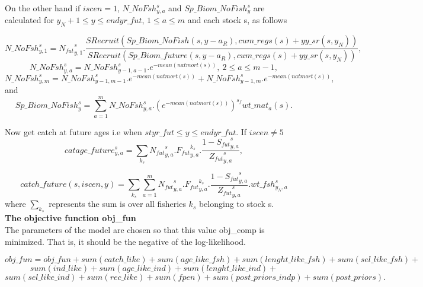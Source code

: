 \documentclass{article}
\begin{document}

On the other hand if $iscen=1$, $N\_NoFsh^s_{y,a}$ and $Sp\_Biom\_NoFish^s_y$ are calculated for $y_N+1\leq y \leq endyr\_fut$, $1\leq a \leq m$ and each stock s, as follows

\begin{equation}
    N\_NoFsh^{s}_{y,1}={N_{fut}}^s_{y,1}.\dfrac{SRecruit(Sp\_Biom\_NoFish(s,y-a_R),cum\_regs(s)+yy\_sr(s,y_N))}{ SRecruit(Sp\_Biom\_future(s,y-a_R),cum\_regs(s)+yy\_sr(s,y_N))},
\end{equation}
\begin{equation}
    N\_NoFsh^{s}_{y,a}=N\_NoFsh^s_{y-1,a-1}.e^{-mean(natmort(s))}, \ 2\leq a\leq m-1,
\end{equation}
\begin{equation}
    N\_NoFsh^s_{y,m}=N\_NoFsh^s_{y-1,m-1}.e^{-mean(natmort(s))}+N\_NoFsh^s_{y-1,m}.e^{-mean(natmort(s))},
\end{equation}
and
\begin{equation}
    Sp\_Biom\_NoFish^s_y   = \sum_{a=1}^mN\_NoFsh^s_{y,a}.(e^{-mean(natmort(s))})^{s_f}  wt\_{mat}_a(s).
\end{equation}

Now get catch at future ages i.e when $styr\_fut \leq y \leq endyr\_fut$. If $iscen \neq 5$
\begin{equation}
    catage\_future^s_{y,a}=\sum_{k_s} {N_{fut}}^s_{y,a}.{F_{fut}}^{k_s}_{y,a}.\dfrac{1-{S_{fut}}^s_{y,a}}{{Z_{fut}}^s_{y,a}},
\end{equation}

\begin{equation}
    catch\_future(s,iscen,y)=\sum_{k_s} \sum_{a=1}^m{N_{fut}}^s_{y,a}.{F_{fut}}^{k_s}_{y,a}.\dfrac{1-{S_{fut}}^s_{y,a}}{{Z_{fut}}^s_{y,a}}.wt\_fsh^s_{y_N,a}
\end{equation}
where $\displaystyle\sum_{k_s}$ represents the sum is over all fisheries $k_s$ belonging to stock s.\\

\textbf{The objective function obj\_fun}\\

The parameters of the model are chosen so that this value obj\_comp is minimized. That is, it should be the negative of the log-likelihood.

\begin{equation}
    obj\_fun=obj\_fun+sum(catch\_like)+sum(age\_like\_fsh)+sum(lenght\_like\_fsh)+sum(sel\_like\_fsh)+
\end{equation}
\begin{equation*}
    sum(ind\_like)+sum(age\_like\_ind)+sum(lenght\_like\_ind)+
\end{equation*}
\begin{equation*}
    sum(sel\_like\_ind)+sum(rec\_like)+sum(fpen)+sum(post\_priors\_indp)+sum(post\_priors).
\end{equation*}
\end{document}
